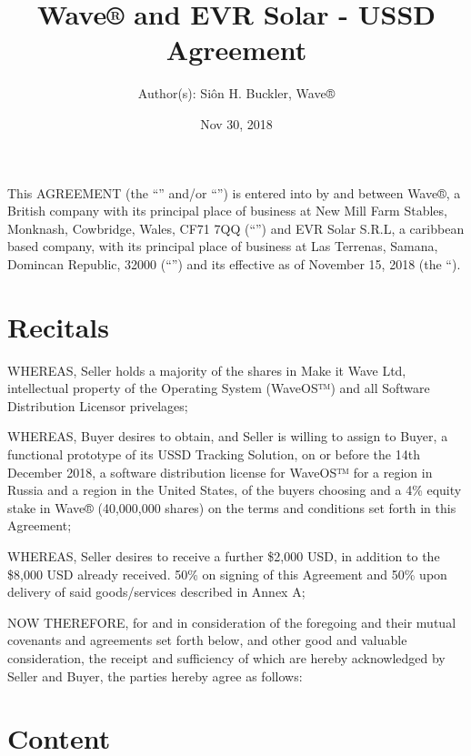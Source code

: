 \documentclass[letterpaper,10pt,english]{sphinxmanual}
\title{Wave® and EVR Solar - USSD Agreement}
\date{Nov 30, 2018}
\author{Author(s): Siôn H. Buckler, Wave®}
\begin{document}
\maketitle
\sphinxtableofcontents
{}\label{\detokenize{index::doc}}


This AGREEMENT (the “” and/or “”) is entered into by and between Wave®, a British company with its principal place of business at New Mill Farm Stables, Monknash, Cowbridge, Wales, CF71 7QQ (“”)  and EVR Solar S.R.L, a caribbean based company, with its principal place of business at Las Terrenas, Samana, Domincan Republic, 32000  (“”) and its effective as of November 15, 2018 (the “).


\chapter{Recitals}
\label{\detokenize{index:recitals}}
WHEREAS, Seller holds a majority of the shares in Make it Wave Ltd, intellectual property of the Operating System (WaveOS™) and all Software Distribution Licensor privelages;

WHEREAS, Buyer desires to obtain, and Seller is willing to assign to Buyer, a functional prototype of its USSD Tracking Solution, on or before the 14th December 2018, a software distribution license for WaveOS™ for a region in Russia and a region in the United States, of the buyers choosing and a 4\% equity stake in Wave® (40,000,000 shares) on the terms and conditions set forth in this Agreement;

WHEREAS, Seller desires to receive a further \$2,000 USD, in addition to the \$8,000 USD already received. 50\% on signing of this Agreement and 50\% upon delivery of said goods/services described in Annex A;

NOW THEREFORE, for and in consideration of the foregoing and their mutual covenants and agreements set forth below, and other good and valuable consideration, the receipt and sufficiency of which are hereby acknowledged by Seller and Buyer, the parties hereby agree as follows:


\chapter{Content}
\label{\detokenize{index:content}}
\end{document}
